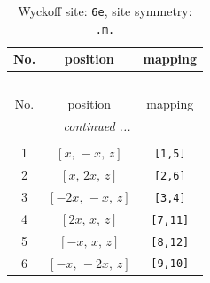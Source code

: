 \documentclass[fleqn,8pt]{jsarticle}
\begin{document}
\renewcommand{\arraystretch}{1.2}
\begin{longtable}{ccc}
\caption{Wyckoff site: {\tt 6e}, site symmetry: {\tt .m.}}
 \\
 \hline \hline
No. & position & mapping \\ \hline \endfirsthead

\multicolumn{2}{l}{\tablename\ \thetable{}} \\
 \hline \hline
No. & position & mapping \\ \hline \endhead

 \hline \hline
\multicolumn{2}{r}{\footnotesize\it continued ...} \\ \endfoot

 \hline \hline
\multicolumn{2}{r}{} \\ \endlastfoot

1 & $\left[ x,\, - x,\, z \right]$ & {\tt [1,5]} \\ \hline
2 & $\left[ x,\, 2 x,\, z \right]$ & {\tt [2,6]} \\ \hline
3 & $\left[ - 2 x,\, - x,\, z \right]$ & {\tt [3,4]} \\ \hline
4 & $\left[ 2 x,\, x,\, z \right]$ & {\tt [7,11]} \\ \hline
5 & $\left[ - x,\, x,\, z \right]$ & {\tt [8,12]} \\ \hline
6 & $\left[ - x,\, - 2 x,\, z \right]$ & {\tt [9,10]} \\
\end{longtable}
\renewcommand{\arraystretch}{1.2}
\end{document}
